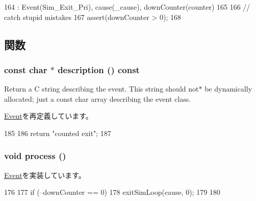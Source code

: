 \begin{DoxyCode}
164     : Event(Sim_Exit_Pri), cause(_cause), downCounter(counter)
165 {
166     // catch stupid mistakes
167     assert(downCounter > 0);
168 }
\end{DoxyCode}


\subsection{関数}
\hypertarget{classCountedExitEvent_a5a14fe478e2393ff51f02e9b7be27e00}{
\subsubsection[{description}]{\setlength{\rightskip}{0pt plus 5cm}const char $\ast$ description () const}}
\label{classCountedExitEvent_a5a14fe478e2393ff51f02e9b7be27e00}
Return a C string describing the event. This string should not$\ast$ be dynamically allocated; just a const char array describing the event class. 

\hyperlink{classEvent_a130ddddf003422b413e2e891b1b80e8f}{Event}を再定義しています。


\begin{DoxyCode}
185 {
186     return "counted exit";
187 }
\end{DoxyCode}
\hypertarget{classCountedExitEvent_a2e9c5136d19b1a95fc427e0852deab5c}{
\subsubsection[{process}]{\setlength{\rightskip}{0pt plus 5cm}void process ()}}
\label{classCountedExitEvent_a2e9c5136d19b1a95fc427e0852deab5c}


\hyperlink{classEvent_a142b75b68a6291400e20fb0dd905b1c8}{Event}を実装しています。


\begin{DoxyCode}
176 {
177     if (--downCounter == 0) {
178         exitSimLoop(cause, 0);
179     }
180 }
\end{DoxyCode}



